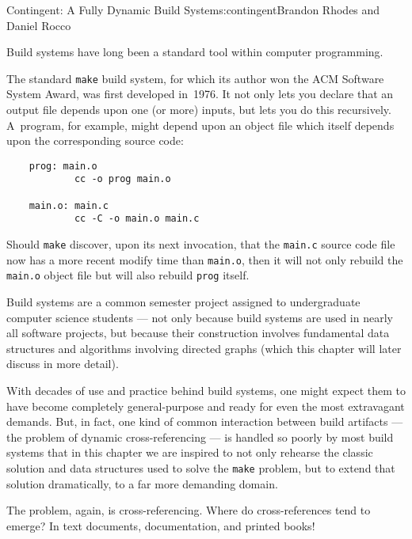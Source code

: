 \begin{aosachapter}{Contingent: A Fully Dynamic Build System}{s:contingent}{Brandon Rhodes and Daniel Rocco}

\label{introduction}

Build systems have long been a standard tool within computer
programming.

The standard \texttt{make} build system, for which its author won the
ACM Software System Award, was first developed in~1976. It not only lets
you declare that an output file depends upon one (or more) inputs, but
lets you do this recursively. A~program, for example, might depend upon
an object file which itself depends upon the corresponding source code:

\begin{verbatim}
    prog: main.o
            cc -o prog main.o

    main.o: main.c
            cc -C -o main.o main.c
\end{verbatim}

Should \texttt{make} discover, upon its next invocation, that the
\texttt{main.c} source code file now has a more recent modify time than
\texttt{main.o}, then it will not only rebuild the \texttt{main.o}
object file but will also rebuild \texttt{prog} itself.

Build systems are a common semester project assigned to undergraduate
computer science students --- not only because build systems are used in
nearly all software projects, but because their construction involves
fundamental data structures and algorithms involving directed graphs
(which this chapter will later discuss in more detail).

With decades of use and practice behind build systems, one might expect
them to have become completely general-purpose and ready for even the
most extravagant demands. But, in fact, one kind of common interaction
between build artifacts --- the problem of dynamic cross-referencing ---
is handled so poorly by most build systems that in this chapter we are
inspired to not only rehearse the classic solution and data structures
used to solve the \texttt{make} problem, but to extend that solution
dramatically, to a far more demanding domain.

The problem, again, is cross-referencing. Where do cross-references tend
to emerge? In text documents, documentation, and printed books!

\label{the-problem-building-document-systems}


\end{aosachapter}

